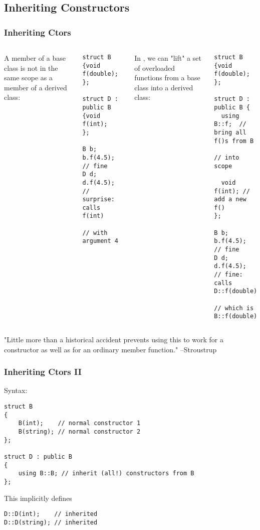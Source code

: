 \subsection{Inheriting Constructors}

\begin{frame}[fragile]
\frametitle{Inheriting Ctors}

\begin{columns}[t]
A member of a base class is not in the same scope as a member of a derived class:
{\scriptsize
\begin{verbatim}
struct B            {void f(double); };

struct D : public B {void f(int);    };

B b;   b.f(4.5);  // fine
D d;   d.f(4.5);  // surprise: calls f(int)
                  // with argument 4
\end{verbatim}
}
\pause{}
In , we can "lift" a set of overloaded functions from a base class into a derived class:
{\scriptsize
\begin{verbatim}
struct B {void f(double);  };

struct D : public B {
  using B::f;  // bring all f()s from B
               // into scope

  void f(int); // add a new f()
};

B b;   b.f(4.5); // fine
D d;   d.f(4.5); // fine: calls D::f(double)
                 // which is B::f(double)
\end{verbatim}
}
\end{columns}
\pause{}
\vskip 24pt
"Little more than a historical accident prevents using this to work for a constructor as well as for an ordinary member function." --Stroustrup
\end{frame}

\begin{frame}[fragile]
\frametitle{Inheriting Ctors II}

Syntax:


{\scriptsize
\begin{verbatim}
struct B
{
    B(int);    // normal constructor 1
    B(string); // normal constructor 2
};

struct D : public B
{
    using B::B; // inherit (all!) constructors from B
};
\end{verbatim}
}
This implicitly defines
{\scriptsize
\begin{verbatim}
D::D(int);    // inherited
D::D(string); // inherited
\end{verbatim}
}
\end{frame}

